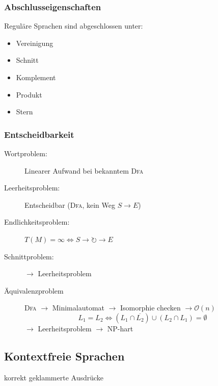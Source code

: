 \documentclass{scrartcl}
\begin{document}
\subsubsection*{Abschlusseigenschaften}
\begin{shaded}
    Reguläre Sprachen sind abgeschlossen unter:
    \begin{itemize}
        \item Vereinigung
        \item Schnitt
        \item Komplement
        \item Produkt
        \item Stern
    \end{itemize}
\end{shaded}

\subsubsection*{Entscheidbarkeit}
\begin{description}
    \item[Wortproblem:] Linearer Aufwand bei bekanntem \textsc{Dfa}
    \item[Leerheitsproblem:] Entscheidbar (\textsc{Dfa}, kein Weg $S\to E$)
    \item[Endlichkeitsproblem:] $T(M) = \infty \Leftrightarrow S\to\circlearrowright\to E$
    \item[Schnittproblem:] $\to$ Leerheitsproblem
    \item[Äquivalenzproblem] \textsc{Dfa} $\to$ Minimalautomat $\to$ Isomorphie checken $\to \mathcal{O}(n)$
    \[ L_1 = L_2 \Leftrightarrow \left(L_1 \cap \overline{L_2}\right) \cup \left(L_2 \cap L_1\right) = \emptyset \]
    $\to$ Leerheitsproblem $\to$ NP-hart
\end{description}

\subsection*{Kontextfreie Sprachen}
{\tiny korrekt geklammerte Ausdrücke}
\end{document}
